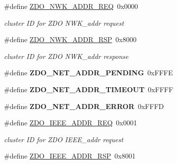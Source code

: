 \begin{DoxyCompactItemize}
\mbox{\label{group__zdo_ga1458b65a34a4f94893f5d0ba12a4f4d8}} 
\#define \hyperlink{group__zdo_ga1458b65a34a4f94893f5d0ba12a4f4d8}{Z\+D\+O\+\_\+\+N\+W\+K\+\_\+\+A\+D\+D\+R\+\_\+\+R\+EQ}~0x0000
\begin{DoxyCompactList}\small\item\em cluster ID for Z\+DO N\+W\+K\+\_\+addr request \end{DoxyCompactList}\item 
\mbox{\label{group__zdo_ga27214fd0c8264e185af650aaaa937cca}} 
\#define \hyperlink{group__zdo_ga27214fd0c8264e185af650aaaa937cca}{Z\+D\+O\+\_\+\+N\+W\+K\+\_\+\+A\+D\+D\+R\+\_\+\+R\+SP}~0x8000
\begin{DoxyCompactList}\small\item\em cluster ID for Z\+DO N\+W\+K\+\_\+addr response \end{DoxyCompactList}\item 
\mbox{\label{group__zdo_gab08dbfd2d3ac3420d6983d57250b5ff6}} 
\#define {\bfseries Z\+D\+O\+\_\+\+N\+E\+T\+\_\+\+A\+D\+D\+R\+\_\+\+P\+E\+N\+D\+I\+NG}~0x\+F\+F\+FE
\item 
\mbox{\label{group__zdo_ga0fc0eab688d3729212b53bf879c939da}} 
\#define {\bfseries Z\+D\+O\+\_\+\+N\+E\+T\+\_\+\+A\+D\+D\+R\+\_\+\+T\+I\+M\+E\+O\+UT}~0x\+F\+F\+FF
\item 
\mbox{\label{group__zdo_gab6d2ba7c42eb7cc0016b7bec3e5f3439}} 
\#define {\bfseries Z\+D\+O\+\_\+\+N\+E\+T\+\_\+\+A\+D\+D\+R\+\_\+\+E\+R\+R\+OR}~0x\+F\+F\+FD
\item 
\mbox{\label{group__zdo_ga912ec46cfce0729c06fa48e6298cb20f}} 
\#define \hyperlink{group__zdo_ga912ec46cfce0729c06fa48e6298cb20f}{Z\+D\+O\+\_\+\+I\+E\+E\+E\+\_\+\+A\+D\+D\+R\+\_\+\+R\+EQ}~0x0001
\begin{DoxyCompactList}\small\item\em cluster ID for Z\+DO I\+E\+E\+E\+\_\+addr request \end{DoxyCompactList}\item 
\mbox{\label{group__zdo_ga13eaf1fb0a36978e8c2f9aa7a613238f}} 
\#define \hyperlink{group__zdo_ga13eaf1fb0a36978e8c2f9aa7a613238f}{Z\+D\+O\+\_\+\+I\+E\+E\+E\+\_\+\+A\+D\+D\+R\+\_\+\+R\+SP}~0x8001

\end{DoxyCompactItemize}
